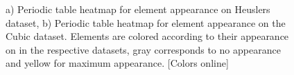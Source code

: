 \documentclass[article]{elsarticle}
\begin{document}
\begin{figure}[H]
    \centering
        \quad
\caption{a) Periodic table heatmap for element appearance on Heuslers dataset, b) Periodic table heatmap for element appearance on the Cubic dataset. Elements are colored according to their appearance on in the respective datasets, gray corresponds to no appearance and yellow for maximum appearance. [Colors online]}
\label{fig:dataset_compo}
\end{figure}
\end{document}
